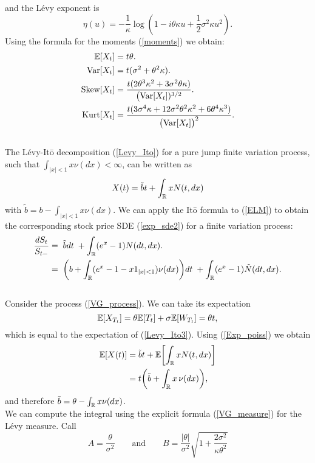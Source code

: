 and the Lévy exponent is 
\begin{equation}
 \eta(u) = -\frac{1}{\kappa} \log(1-i\theta \kappa u + \frac{1}{2} \sigma^2 \kappa u^2).
\end{equation}
Using the formula for the moments (\ref{moments}) we obtain:
\begin{align}\label{VG_cumulants}
 \mathbb{E}[X_t] &= t\theta. \\ \nonumber
 \mbox{Var}[X_t] &= t(\sigma^2 + \theta^2 \kappa). \\ \nonumber
 \mbox{Skew}[X_t] &= \frac{t (2\theta^3\kappa^2 + 3 \sigma^2 \theta \kappa)}{\bigl(\mbox{Var}[X_t])^{3/2}}. \\ \nonumber
 \mbox{Kurt}[X_t] &= \frac{t (3\sigma^4 \kappa + 12\sigma^2 \theta^2 \kappa^2 +6\theta^4\kappa^3)}{\bigl(\mbox{Var}[X_t]\bigr)^2}.\nonumber 
\end{align}
\\
The Lévy-It\={o} decomposition (\ref{Levy_Ito}) for a pure jump finite variation process, such that $\int_{|x|<1} x \nu(dx) < \infty$, 
can be written as
\begin{equation}\label{Levy_Ito3}
X(t) = \tilde b t + \int_{\mathbb{R}} x N(t,dx) 
\end{equation}
with $\tilde b = b - \int_{|x|<1} x \nu(dx)$. We can apply the It\={o} formula to (\ref{ELM}) to obtain the corresponding
stock price SDE (\ref{exp_sde2}) for a finite variation process: 
\begin{align}
 \frac{d S_t}{S_{t-}}  &= \; \tilde b dt \; + \int_{\mathbb{R}} (e^{x} - 1) N(dt,dx).  \\ \nonumber
                       &= \; \biggl( b + \int_{\mathbb{R}} (e^{x} -1 -x1_{|x|<1}) \nu(dx) \biggr) dt \; + \int_{\mathbb{R}} (e^{x} - 1) \tilde N(dt,dx).  
\end{align}
\\
Consider the process (\ref{VG_process}). We can take its expectation 
$$\mathbb{E}[X_{T_t}] = \theta \mathbb{E}[T_t] + \sigma \mathbb{E}[W_{T_t}] = \theta t,$$ 
which is equal to the expectation of (\ref{Levy_Ito3}). Using (\ref{Exp_poiss}) we obtain
\begin{align}
 \mathbb{E}[X(t)] &= \tilde b t + \mathbb{E} \biggl[ \int_{\mathbb{R}} x N(t,dx)\biggr] \\ \nonumber
	  &= t \biggl( \tilde b + \int_{\mathbb{R}} x \, \nu(dx) \biggr), \nonumber
\end{align}
and therefore $ \tilde b = \theta - \int_{\mathbb{R}} x \nu(dx) $.\\
We can compute the integral using the explicit formula (\ref{VG_measure}) for the Lévy measure.
Call $$A = \frac{\theta}{\sigma^2} \hspace{2em} \mbox{and} \hspace{2em} 
B=\frac{|\theta|}{\sigma^2}\sqrt{1+\frac{2\sigma^2}{\kappa \theta^2}}$$

